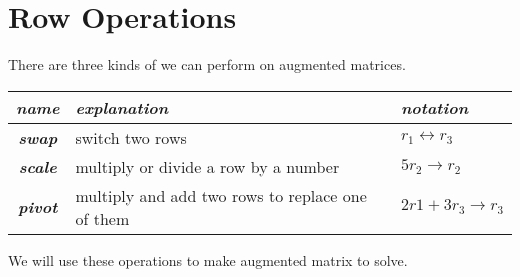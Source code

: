 \section{Row Operations}

There are three kinds of  
we can perform on augmented matrices.
\begin{center}
  \large
  \begin{tabular}{c|l|l}
    {\normalsize\itshape name} & 
    {\normalsize\itshape explanation} & 
    {\normalsize\itshape notation} \\
    \hline\hline
    {\bfseries\itshape swap}  
      & switch two rows 
      & $r_1 \longleftrightarrow r_3$ \\
    {\bfseries\itshape scale} 
      & multiply or divide a row by a number 
      & $5r_2 \longrightarrow r_2$ \\
    {\bfseries\itshape pivot} 
      & multiply and add two rows to replace one of them 
      & $2r1 + 3r_3 \longrightarrow r_3$ \\
  \end{tabular}
\end{center}

We will use these operations to make  augmented matrix  
to solve.